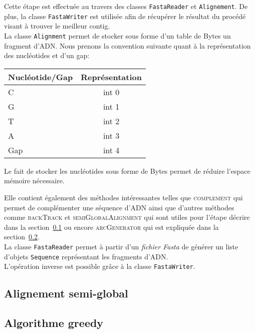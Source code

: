 Cette étape est effectuée au travers des classes \verb|FastaReader| et \verb|Alignement|. De plus, la classe \verb|FastaWriter| est utilisée afin de récupérer le résultat du procédé visant à trouver le meilleur contig.\\

La classe \verb|Alignment| permet de stocker sous forme d'un table de Bytes un fragment d'ADN. Nous prenons la convention suivante quant à la représentation des nucléotides et d'un gap:
	\begin{center}
		\begin{tabular}{|l|c|}
			\hline
			Nucléotide/Gap & Représentation \\
			\hline
			\hline
			C & int 0 \\
			\hline
			G & int 1\\
			\hline
			T & int 2 \\
			\hline
			A & int 3 \\
			\hline
			Gap & int 4 \\
			\hline

		\end{tabular}
	\end{center}
	
	Le fait de stocker les nucléotides sous forme de Bytes permet de réduire l'espace mémoire nécessaire.
		
	  Elle contient également des méthodes intéressantes telles que \textsc{complement} qui permet de complémenter une séquence d'ADN ainsi que d'autres méthodes comme \textsc{backTrack} et \textsc{semiGlobalAlignment} qui sont utiles pour l'étape décrire dans la section~\ref{subsection:semiGlobal} ou encore \textsc{arcGenerator} qui est expliquée dans la section~\ref{subsection:greedy}.\\
	
La classe \verb|FastaReader| permet à partir d'un \emph{fichier Fasta} de générer un liste d'objets \verb|Sequence| représentant les fragments d'ADN. \\

L'opération inverse est possible grâce à la classe \verb|FastaWriter|.


	


\subsection{Alignement semi-global}
\label{subsection:semiGlobal}


\subsection{Algorithme greedy}
\label{subsection:greedy}

